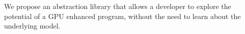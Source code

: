 We propose an abstraction library that allows a developer to explore the potential of a GPU enhanced program, without the need to learn about the underlying model.